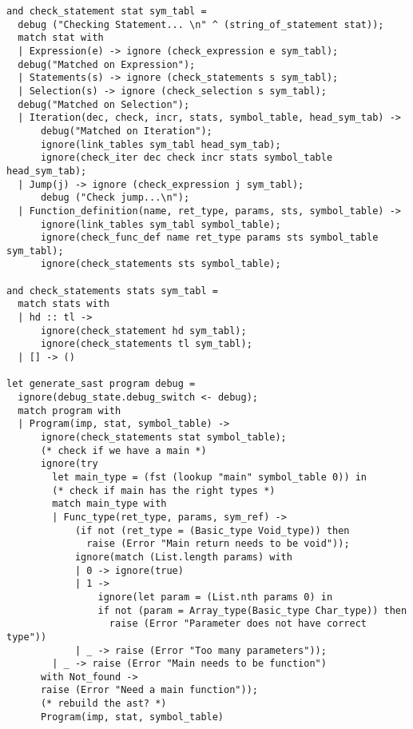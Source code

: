 \begin{verbatim}
and check_statement stat sym_tabl =
  debug ("Checking Statement... \n" ^ (string_of_statement stat));
  match stat with
  | Expression(e) -> ignore (check_expression e sym_tabl);
  debug("Matched on Expression");
  | Statements(s) -> ignore (check_statements s sym_tabl);
  | Selection(s) -> ignore (check_selection s sym_tabl);
  debug("Matched on Selection");
  | Iteration(dec, check, incr, stats, symbol_table, head_sym_tab) ->
      debug("Matched on Iteration");
      ignore(link_tables sym_tabl head_sym_tab);
      ignore(check_iter dec check incr stats symbol_table head_sym_tab);
  | Jump(j) -> ignore (check_expression j sym_tabl);
      debug ("Check jump...\n");
  | Function_definition(name, ret_type, params, sts, symbol_table) ->
      ignore(link_tables sym_tabl symbol_table);
      ignore(check_func_def name ret_type params sts symbol_table sym_tabl);
      ignore(check_statements sts symbol_table);

and check_statements stats sym_tabl =
  match stats with
  | hd :: tl ->
      ignore(check_statement hd sym_tabl);
      ignore(check_statements tl sym_tabl);
  | [] -> ()

let generate_sast program debug =
  ignore(debug_state.debug_switch <- debug);
  match program with
  | Program(imp, stat, symbol_table) ->
      ignore(check_statements stat symbol_table);
      (* check if we have a main *)
      ignore(try
        let main_type = (fst (lookup "main" symbol_table 0)) in
        (* check if main has the right types *)
        match main_type with
        | Func_type(ret_type, params, sym_ref) ->
            (if not (ret_type = (Basic_type Void_type)) then
              raise (Error "Main return needs to be void"));
            ignore(match (List.length params) with
            | 0 -> ignore(true)
            | 1 ->
                ignore(let param = (List.nth params 0) in
                if not (param = Array_type(Basic_type Char_type)) then
                  raise (Error "Parameter does not have correct type"))
            | _ -> raise (Error "Too many parameters"));
        | _ -> raise (Error "Main needs to be function")
      with Not_found ->
      raise (Error "Need a main function"));
      (* rebuild the ast? *)
      Program(imp, stat, symbol_table)
\end{verbatim}